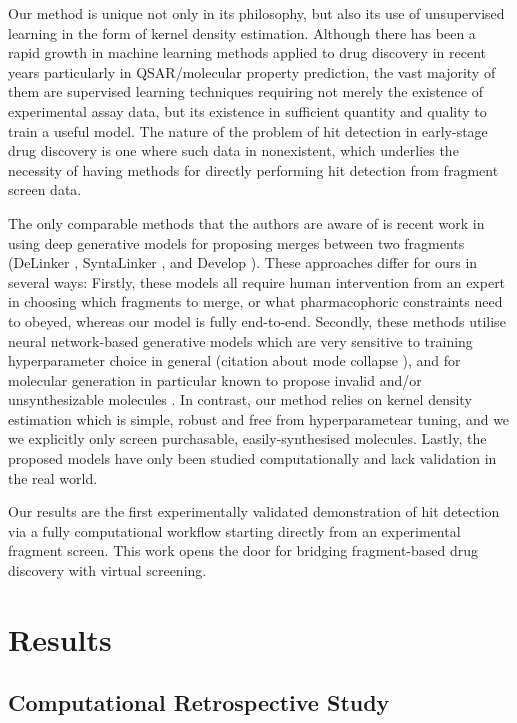 \documentclass[journal=jacsat,manuscript=article]{achemso}
\begin{document}
Our method is unique not only in its philosophy, but also its use of unsupervised learning in the form of kernel density estimation. Although there has been a rapid growth in machine learning methods applied to drug discovery in recent years particularly in QSAR/molecular property prediction, the vast majority of them are supervised learning techniques requiring not merely the existence of experimental assay data, but its existence in sufficient quantity and quality to train a useful model. The nature of the problem of hit detection in early-stage drug discovery is one where such data in nonexistent, which underlies the necessity of having methods for directly performing hit detection from fragment screen data. 

The only comparable methods that the authors are aware of is recent work in using deep generative models for proposing merges between two fragments (DeLinker \cite{Imrie2020DeLinker}, SyntaLinker \cite{Yang2020SyntaLinker}, and Develop \cite{Imrie2021Develop}). These approaches differ for ours in several ways: Firstly, these models all require human intervention from an expert in choosing which fragments to merge, or what pharmacophoric constraints need to obeyed, whereas our model is fully end-to-end. Secondly, these methods utilise neural network-based generative models which are very sensitive to training hyperparameter choice in general (citation about mode collapse \cite{?}), and for molecular generation in particular known to propose invalid and/or unsynthesizable molecules \cite{Gao2020Synthesizability}. In contrast, our method relies on kernel density estimation which is simple, robust and free from hyperparametear tuning, and we we explicitly only screen purchasable, easily-synthesised molecules. Lastly, the proposed models have only been studied computationally and lack validation in the real world.

Our results are the first experimentally validated demonstration of hit detection via a fully computational workflow starting directly from an experimental fragment screen. This work opens the door for bridging fragment-based drug discovery with virtual screening.

\section{Results}


\subsection{Computational Retrospective Study}
\end{document}
